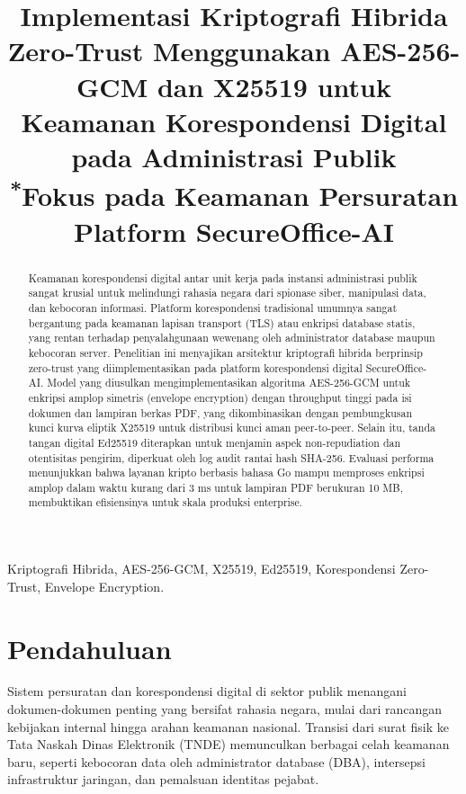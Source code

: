 \documentclass[conference]{IEEEtran}
\begin{document}
\title{Implementasi Kriptografi Hibrida Zero-Trust Menggunakan AES-256-GCM dan X25519 untuk Keamanan Korespondensi Digital pada Administrasi Publik\\
{\footnotesize \textsuperscript{*}Fokus pada Keamanan Persuratan Platform SecureOffice-AI}}

\author{
}

\maketitle

\begin{abstract}
Keamanan korespondensi digital antar unit kerja pada instansi administrasi publik sangat krusial untuk melindungi rahasia negara dari spionase siber, manipulasi data, dan kebocoran informasi. Platform korespondensi tradisional umumnya sangat bergantung pada keamanan lapisan transport (TLS) atau enkripsi database statis, yang rentan terhadap penyalahgunaan wewenang oleh administrator database maupun kebocoran server. Penelitian ini menyajikan arsitektur kriptografi hibrida berprinsip zero-trust yang diimplementasikan pada platform korespondensi digital SecureOffice-AI. Model yang diusulkan mengimplementasikan algoritma AES-256-GCM untuk enkripsi amplop simetris (envelope encryption) dengan throughput tinggi pada isi dokumen dan lampiran berkas PDF, yang dikombinasikan dengan pembungkusan kunci kurva eliptik X25519 untuk distribusi kunci aman peer-to-peer. Selain itu, tanda tangan digital Ed25519 diterapkan untuk menjamin aspek non-repudiation dan otentisitas pengirim, diperkuat oleh log audit rantai hash SHA-256. Evaluasi performa menunjukkan bahwa layanan kripto berbasis bahasa Go mampu memproses enkripsi amplop dalam waktu kurang dari 3 ms untuk lampiran PDF berukuran 10 MB, membuktikan efisiensinya untuk skala produksi enterprise.
\end{abstract}

\begin{IEEEkeywords}
Kriptografi Hibrida, AES-256-GCM, X25519, Ed25519, Korespondensi Zero-Trust, Envelope Encryption.
\end{IEEEkeywords}

\section{Pendahuluan}
Sistem persuratan dan korespondensi digital di sektor publik menangani dokumen-dokumen penting yang bersifat rahasia negara, mulai dari rancangan kebijakan internal hingga arahan keamanan nasional. Transisi dari surat fisik ke Tata Naskah Dinas Elektronik (TNDE) memunculkan berbagai celah keamanan baru, seperti kebocoran data oleh administrator database (DBA), intersepsi infrastruktur jaringan, dan pemalsuan identitas pejabat.
\end{document}
